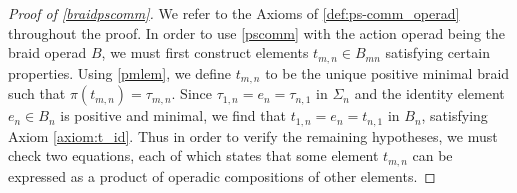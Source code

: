 \begin{proof}[Proof of \cref{braidpscomm}]
We refer to the Axioms of \cref{def:ps-comm_operad} throughout the proof. In order to use \cref{pscomm} with the action operad being the braid operad $B$, we must first construct elements $t_{m,n} \in B_{mn}$ satisfying certain properties. Using \cref{pmlem}, we define $t_{m,n}$ to be the unique positive minimal braid such that $\pi(t_{m,n}) = \tau_{m,n}$. Since $\tau_{1,n} = e_{n} = \tau_{n,1}$ in $\Sigma_{n}$ and the identity element $e_{n} \in B_{n}$ is positive and minimal, we find that $t_{1,n} = e_{n} = t_{n,1}$ in $B_{n}$, satisfying Axiom \ref{axiom:t_id}. Thus in order to verify the remaining hypotheses, we must check two equations, each of which states that some element $t_{m,n}$ can be expressed as a product of operadic compositions of other elements.


\end{proof}
